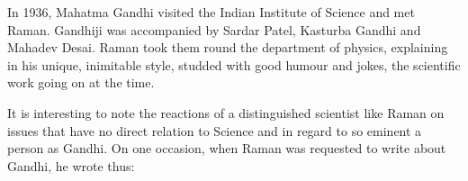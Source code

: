 \bigskip
{}
\smallskip

\noindent
In 1936, Mahatma Gandhi visited the Indian Institute of Science and met Raman. Gandhiji was accompanied by Sardar Patel, Kasturba Gandhi and Mahadev Desai. Raman took them round the department of physics, explaining in his unique, inimitable style, studded with good humour and jokes, the scientific work going on at the time.

It is interesting to note the reactions of a distinguished scientist like Raman on issues that have no direct relation to Science and in regard to so eminent a person as Gandhi. On one occasion, when Raman was requested to write about Gandhi, he wrote thus:
